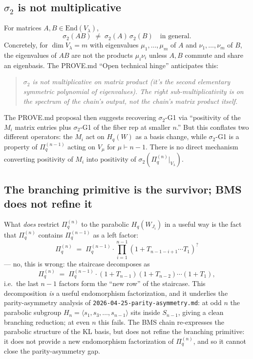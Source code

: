 \documentclass{article}
\theoremstyle{definition}
\begin{document}
\subsection{$\sigma_2$ is not multiplicative}

For matrices $A, B \in \mathrm{End}(V_\lambda)$,
\[
\sigma_2(A B) \;\neq\; \sigma_2(A)\,\sigma_2(B)
\quad \text{in general.}
\]
Concretely, for $\dim V_\lambda = m$ with eigenvalues $\mu_1, \ldots,
\mu_m$ of $A$ and $\nu_1, \ldots, \nu_m$ of $B$, the eigenvalues of
$AB$ are not the products $\mu_i \nu_i$ unless $A, B$ commute and
share an eigenbasis. The PROVE.md ``Open technical hinge'' anticipates
this:
\begin{quote}
\emph{$\sigma_2$ is not multiplicative on matrix product (it's the
second elementary symmetric polynomial of eigenvalues). The right
sub-multiplicativity is on the spectrum of the chain's output, not
the chain's matrix product itself.}
\end{quote}
The PROVE.md proposal then suggests recovering $\sigma_2$-G1 via
``positivity of the $M_i$ matrix entries plus $\sigma_2$-G1 of the
fiber rep at smaller $n$.'' But this conflates two different
operators: the $M_i$ act on $H_q(W)$ as a basis change, while
$\sigma_2$-G1 is a property of $\Pi_q^{(n-1)}$ acting on $V_\mu$ for
$\mu \vdash n-1$. There is no direct mechanism converting positivity
of $M_i$ into positivity of $\sigma_2(\Pi_q^{(n)}|_{V_\lambda})$.

\subsection{The branching primitive is the survivor; BMS does not refine it}

What \emph{does} restrict $\Pi_q^{(n)}$ to the parabolic
$H_q(W_{J_i})$ in a useful way is the fact that $\Pi_q^{(n)}$
contains $\Pi_q^{(n-1)}$ as a left factor:
\[
\Pi_q^{(n)} \;=\; \Pi_q^{(n-1)} \cdot \prod_{i=1}^{n-1}(1 + T_{n-1-i+1} \cdots T_1)^{?}
\]
--- no, this is wrong: the staircase decomposes as
\[
\Pi_q^{(n)} \;=\; \Pi_q^{(n-1)} \cdot (1+T_{n-1})(1+T_{n-2})\cdots (1+T_1),
\]
i.e.\ the last $n-1$ factors form the ``new row'' of the staircase.
This decomposition \emph{is} a useful endomorphism factorization, and
it underlies the parity-asymmetry analysis of
\texttt{2026-04-25-parity-asymmetry.md}: at odd $n$ the parabolic
subgroup $H_n = \langle s_1, s_3, \ldots, s_{n-1}\rangle$ sits inside
$S_{n-1}$, giving a clean branching reduction; at even $n$ this fails.
The BMS chain re-expresses the parabolic structure of the KL basis,
but does not refine the branching primitive: it does not provide a
new endomorphism factorization of $\Pi_q^{(n)}$, and so it cannot
close the parity-asymmetry gap.
\end{document}
